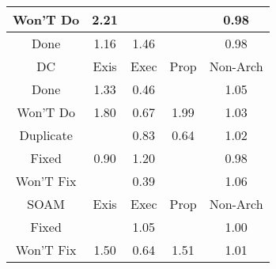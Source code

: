 \begin{tabular}{|c||c|c|c|c|}
\hline
Won'T Do & \cellcolor[rgb]{0.6347624136517656,0.7096243012034679,0.42} 2.21 &  &  & \cellcolor[rgb]{0.9070799289797038,0.8261783305039312,0.41727460038105685} 0.98 \\ 
\hline
Done & \cellcolor[rgb]{0.8743572130648929,0.8231165746096861,0.42} 1.16 & \cellcolor[rgb]{0.8040615656597435,0.7898186363651416,0.41999999999999993} 1.46 &  & \cellcolor[rgb]{0.9069840066416665,0.8257242981038877,0.41718507286555534} 0.98 \\ 
\hline
\hline
DC & Exis & Exec & Prop & Non-Arch \\ 
\hline
Done & \cellcolor[rgb]{0.8357264498659688,0.8048177920417747,0.42000000000000004} 1.33 & \cellcolor[rgb]{0.8088191872039971,0.36107748609892,0.3255645747237307} 0.46 &  & \cellcolor[rgb]{0.8980233642332899,0.8343268567420846,0.42} 1.05 \\ 
\hline
Won'T Do & \cellcolor[rgb]{0.7269312209478624,0.7532832099226717,0.42} 1.80 & \cellcolor[rgb]{0.8483230205226368,0.5480622971404805,0.36243481915446096} 0.67 & \cellcolor[rgb]{0.6834281856594018,0.7326765089965587,0.41999999999999993} 1.99 & \cellcolor[rgb]{0.9040508238423494,0.8371819691884811,0.42} 1.03 \\ 
\hline
Duplicate &  & \cellcolor[rgb]{0.8783699326987586,0.6902843481074571,0.39047860385217464} 0.83 & \cellcolor[rgb]{0.842375170343727,0.5199091396269744,0.35688349232081185} 0.64 & \cellcolor[rgb]{0.905838346329102,0.8380286903664167,0.42} 1.02 \\ 
\hline
Fixed & \cellcolor[rgb]{0.8911372131936005,0.7507161424497094,0.4023947323140272} 0.90 & \cellcolor[rgb]{0.865190262854947,0.8187743350365538,0.42} 1.20 &  & \cellcolor[rgb]{0.9064101207039359,0.8230079046652963,0.4166494459903401} 0.98 \\ 
\hline
Won'T Fix &  & \cellcolor[rgb]{0.7959408034059773,0.30011980278829253,0.31354474984557884} 0.39 &  & \cellcolor[rgb]{0.896119625436501,0.8334250857330794,0.42} 1.06 \\ 
\hline
\hline
SOAM & Exis & Exec & Prop & Non-Arch \\ 
\hline
Fixed &  & \cellcolor[rgb]{0.8996657244817833,0.835104816859792,0.42} 1.05 &  & \cellcolor[rgb]{0.9094914884285048,0.8375930452282561,0.41952538919993776} 1.00 \\ 
\hline
Won'T Fix & \cellcolor[rgb]{0.7961147509210829,0.7860543556994602,0.42} 1.50 & \cellcolor[rgb]{0.8426492297976449,0.5212063543755194,0.35713928114446863} 0.64 & \cellcolor[rgb]{0.7941585821662869,0.7851277494471885,0.42} 1.51 & \cellcolor[rgb]{0.9071449294337232,0.8386475981528162,0.42} 1.01 \\ 

\end{tabular}
